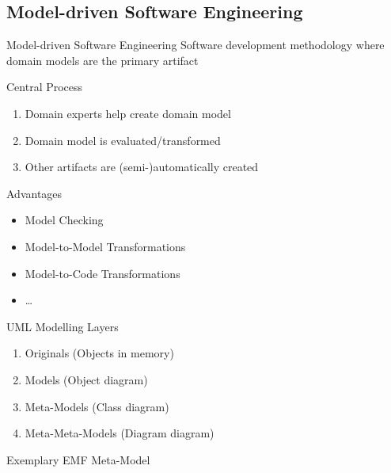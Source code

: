 \subsection{Model-driven Software Engineering}
\begin{frame}{\insertsubsection{} }
	\begin{fancycolumns}[animation=none]
		\begin{definition}{Model-driven Software Engineering}
			Software development methodology where domain models are the primary artifact
		\end{definition} \pause
		\begin{note}{Central Process}
			\begin{enumerate}
				\item Domain experts help create domain model
				\item Domain model is evaluated/transformed
				\item Other artifacts are (semi-)automatically created
			\end{enumerate}
			
		\end{note}\pause
		\begin{note}{Advantages}
			\begin{itemize}
				\item Model Checking
				\item Model-to-Model Transformations
				\item Model-to-Code Transformations
				\item \dots
			\end{itemize}
		\end{note}
		\nextcolumn
		\begin{note}{UML Modelling Layers}
			\begin{enumerate}
				\item Originals (Objects in memory)
				\item Models (Object diagram)
				\item Meta-Models (Class diagram)
				\item Meta-Meta-Models (Diagram diagram)
			\end{enumerate}
		\end{note}
		\begin{example}{Exemplary EMF Meta-Model}
			\centering{}
		\end{example}
		
	\end{fancycolumns}
\end{frame}

